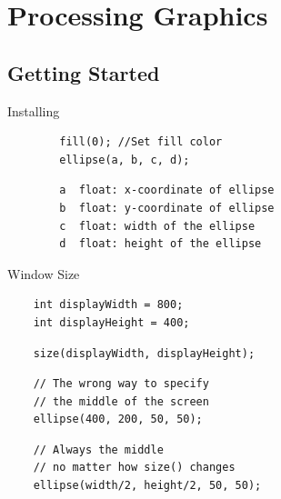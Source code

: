 \section{Processing Graphics}

\subsection{Getting Started}
\begin{frame}[fragile]{Installing}{}
\end{frame}

\begin{frame}[fragile]{}{}
    \Large
    \begin{verbatim}
        fill(0); //Set fill color
        ellipse(a, b, c, d);
    \end{verbatim}
    \pause
    \begin{verbatim}
        a  float: x-coordinate of ellipse
        b  float: y-coordinate of ellipse
        c  float: width of the ellipse
        d  float: height of the ellipse
    \end{verbatim}
\end{frame}

\begin{frame}[fragile]{Window Size}{}
    \Large
    \begin{verbatim}
    int displayWidth = 800;
    int displayHeight = 400;
    \end{verbatim}
    \pause
    \begin{verbatim}
    size(displayWidth, displayHeight);
    \end{verbatim}
    \pause
    \begin{verbatim}
    // The wrong way to specify
    // the middle of the screen
    ellipse(400, 200, 50, 50);
    \end{verbatim}
    \pause
    \begin{verbatim}
    // Always the middle
    // no matter how size() changes
    ellipse(width/2, height/2, 50, 50);
    \end{verbatim}
\end{frame}

